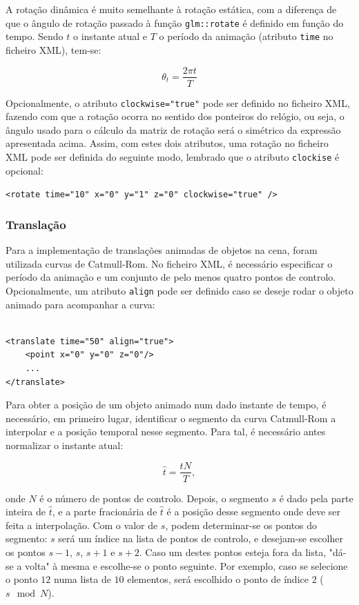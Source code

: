 \documentclass[12pt, a4paper]{article}
\begin{document}
A rotação dinâmica é muito semelhante à rotação estática, com a diferença de que o ângulo de rotação
passado à função \texttt{glm::rotate} é definido em função do tempo. Sendo $t$ o instante atual e
$T$ o período da animação (atributo \texttt{time} no ficheiro XML), tem-se:

$$
\theta_{t} = \frac{2 \pi t}{T}
$$

Opcionalmente, o atributo \texttt{clockwise="true"} pode ser definido no ficheiro XML, fazendo com
que a rotação ocorra no sentido dos ponteiros do relógio, ou seja, o ângulo usado para o cálculo da
matriz de rotação será o simétrico da expressão apresentada acima. Assim, com estes dois atributos,
uma rotação no ficheiro XML pode ser definida do seguinte modo, lembrado que o atributo
\texttt{clockise} é opcional:

\begin{center}
    \texttt{<rotate time="10"\ x="0"\ y="1"\ z="0"\ clockwise="true"\ />}
\end{center}

\subsubsection{Translação}

Para a implementação de translações animadas de objetos na cena, foram utilizada curvas de
Catmull-Rom. No ficheiro XML, é necessário especificar o período da animação e um conjunto de pelo
menos quatro pontos de controlo. Opcionalmente, um atributo \texttt{align} pode ser definido caso se
deseje rodar o objeto animado para acompanhar a curva:

\begin{lstlisting}

<translate time="50" align="true">
    <point x="0" y="0" z="0"/>
    ...
</translate>
\end{lstlisting}

Para obter a posição de um objeto animado num dado instante de tempo, é necessário, em primeiro
lugar, identificar o segmento da curva Catmull-Rom a interpolar e a posição temporal nesse segmento.
Para tal, é necessário antes normalizar o instante atual:

$$
\hat{t} = \frac{t N}{T},
$$

onde $N$ é o número de pontos de controlo. Depois, o segmento $s$ é dado pela parte inteira de
$\hat{t}$, e a parte fracionária de $\hat{t}$ é a posição desse segmento onde deve ser feita a
interpolação. Com o valor de $s$, podem determinar-se os pontos do segmento: $s$ será um índice na
lista de pontos de controlo, e desejam-se escolher os pontos $s - 1$, $s$, $s + 1$ e $s + 2$. Caso
um destes pontos esteja fora da lista, "dá-se a volta"{} à mesma e escolhe-se o ponto seguinte. Por
exemplo, caso se selecione o ponto $12$ numa lista de $10$ elementos, será escolhido o ponto de
índice $2$ ($s \mod N$).
\end{document}
